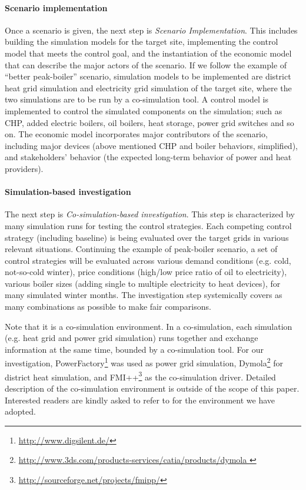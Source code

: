 \documentclass[a4paper,twoside]{article}
\begin{document}
\paragraph{Scenario implementation} 
Once a scenario is given, the next step is {\em Scenario
  Implementation}. This includes building the simulation models 
for the target site, implementing the control model that meets the
control goal, and the instantiation of the economic model that can
describe the major actors of the scenario. 
If we follow the example of  ``better peak-boiler'' scenario,
simulation models to be implemented are district heat grid simulation
and electricity grid simulation of the target site, where the two
simulations are to be run by a co-simulation tool. A control model is
implemented to control the simulated components on the simulation;
such as CHP, added electric boilers, oil boilers, heat storage, power
grid switches and so on. The economic model incorporates major
contributors of the scenario, including major devices (above mentioned
CHP and boiler behaviors, simplified), and stakeholders' behavior (the
expected long-term behavior of power and heat providers). 

\paragraph{Simulation-based investigation} 
The next step is {\em Co-simulation-based investigation}. 
This step is characterized by many simulation runs for testing the
control strategies. 
Each competing control strategy (including baseline) is being
evaluated over the target grids in various relevant situations. 
Continuing the example of peak-boiler scenario, a set
of control strategies will be evaluated across various demand
conditions (e.g. cold, not-so-cold winter), price conditions (high/low
price ratio of oil to electricity), various boiler sizes (adding
single to multiple electricity to heat devices), for many simulated
winter months. The investigation step systemically covers as many 
combinations as possible to make fair comparisons.   

Note that it is a co-simulation environment. In a co-simulation, each
simulation (e.g. heat grid and power grid simulation) runs together
and exchange information at the same time, bounded by a co-simulation
tool. 
For our investigation,
PowerFactory\footnote{\url{http://www.digsilent.de/}} was used as
power grid simulation, Dymola\footnote{\url{http://www.3ds.com/products-services/catia/products/dymola
 }} for district heat simulation, and  FMI++\footnote{\url{http://sourceforge.net/projects/fmipp/}} as the 
co-simulation driver.  
Detailed description of the co-simulation environment is outside of
the scope of this paper. Interested readers are kindly asked to refer
to \cite{Widl_2015} for the environment we have adopted. 
\end{document}
